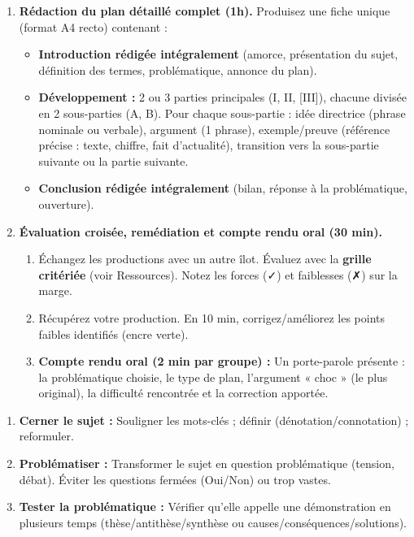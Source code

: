 \documentclass[11pt]{article}
\newcommand{\cle}[1]{{\popxbold\color{popdark}#1}}
\newcounter{popsec}
\newcounter{popsub}
\newcommand{\courssub}[1]{%
  \stepcounter{popsub}%
  \par\vspace{9pt}\noindent{\popxbold\fontsize{11.5}{13}\selectfont\color{popink}{\color{poporange}\thepopsec.\thepopsub}\hspace{6pt}#1}\par\nopagebreak\vspace{4pt}
}
\begin{document}
\begin{enumerate}
    \item \textbf{Rédaction du plan détaillé complet (1h).}
    Produisez une fiche unique (format A4 recto) contenant :
    \begin{itemize}
        \item \textbf{Introduction rédigée intégralement} (amorce, présentation du sujet, définition des termes, problématique, annonce du plan).
        \item \textbf{Développement :} 2 ou 3 parties principales (I, II, [III]), chacune divisée en 2 sous-parties (A, B). Pour chaque sous-partie : \cle{idée directrice} (phrase nominale ou verbale), \cle{argument} (1 phrase), \cle{exemple/preuve} (référence précise : texte, chiffre, fait d'actualité), \cle{transition} vers la sous-partie suivante ou la partie suivante.
        \item \textbf{Conclusion rédigée intégralement} (bilan, réponse à la problématique, ouverture).
    \end{itemize}

    \item \textbf{Évaluation croisée, remédiation et compte rendu oral (30 min).}
    \begin{enumerate}
        \item Échangez les productions avec un autre îlot. Évaluez avec la \textbf{grille critériée} (voir Ressources). Notez les forces (✓) et faiblesses (✗) sur la marge.
        \item Récupérez votre production. En 10 min, corrigez/améliorez les points faibles identifiés (encre verte).
        \item \textbf{Compte rendu oral (2 min par groupe) :} Un porte-parole présente : la problématique choisie, le type de plan, l'argument « choc » (le plus original), la difficulté rencontrée et la correction apportée.
    \end{enumerate}
\end{enumerate}

\courssub{Ressources à mobiliser}
\label{ressources:integration}

\begin{methode}
\begin{enumerate}
    \item \textbf{Cerner le sujet :} Souligner les mots-clés ; définir (dénotation/connotation) ; reformuler.
    \item \textbf{Problématiser :} Transformer le sujet en question problématique (tension, débat). Éviter les questions fermées (Oui/Non) ou trop vastes.
    \item \textbf{Tester la problématique :} Vérifier qu'elle appelle une démonstration en plusieurs temps (thèse/antithèse/synthèse ou causes/conséquences/solutions).
\end{enumerate}
\end{methode}
\end{document}
